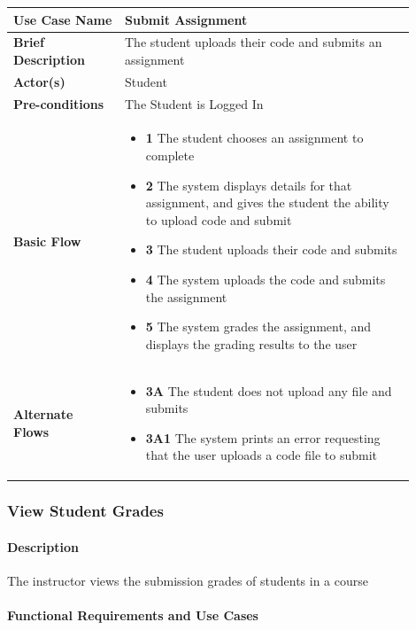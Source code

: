 \documentclass{article}
\begin{document}
\vspace{0.2in}

\begin{tabular}{| p{0.25\linewidth} | p{0.65\linewidth} |}
  \hline
  \textbf{Use Case Name} & Submit Assignment \\
  \hline
  \textbf{Brief Description} & The student uploads their code and submits an assignment \\
  \hline
  \textbf{Actor(s)} & Student \\
  \hline
  \textbf{Pre-conditions} & The Student is Logged In\\
  \hline
  \textbf{Basic Flow} & \begin{itemize}
    \item[] \textbf{1} The student chooses an assignment to complete
    \item[] \textbf{2} The system displays details for that assignment, and gives the student the ability to upload code and submit
    \item[] \textbf{3} The student uploads their code and submits
    \item[] \textbf{4} The system uploads the code and submits the assignment
    \item[] \textbf{5} The system grades the assignment, and displays the grading results to the user
  \end{itemize}\\
  \hline
  \textbf{Alternate Flows} & \begin{itemize}
    \item[] \textbf{3A} The student does not upload any file and submits
    \item[] \textbf{3A1} The system prints an error requesting that the user uploads a code file to submit
  \end{itemize}\\
  \hline
\end{tabular}

\subsubsection{View Student Grades}

\paragraph{Description} The instructor views the submission grades of students in a course

\paragraph{Functional Requirements and Use Cases}
\end{document}
